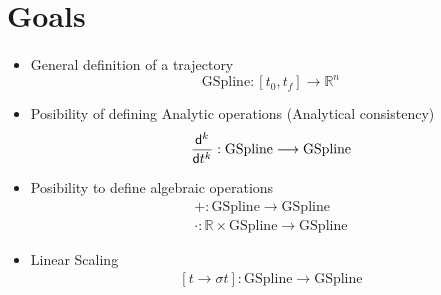 \section{Goals}

\begin{frame}[t]
	\framesubtitle{}

	\begin{itemize}
		\item General definition of a trajectory
		      \begin{equation*}
			      \text{GSpline}:[t_0, t_f] \longrightarrow \mathbb{R}^n
		      \end{equation*}
		\item Posibility of defining Analytic operations (Analytical consistency)
		      \begin{equation*}
			      \frac{\mathsf{d}^{k} }{\mathsf{d} t^{k}}:\text{GSpline}\longrightarrow \text{GSpline}
		      \end{equation*}
		\item Posibility to define algebraic operations
		      \begin{eqnarray*}
			      +:\text{GSpline}\longrightarrow \text{GSpline}\\
			      \cdot:\mathbb{R} \times \text{GSpline}\longrightarrow \text{GSpline}
		      \end{eqnarray*}
		\item Linear Scaling
		      \begin{eqnarray*}
			      \left[t \rightarrow \sigma t \right]:\text{GSpline}\longrightarrow \text{GSpline}
		      \end{eqnarray*}
	\end{itemize}
\end{frame}

